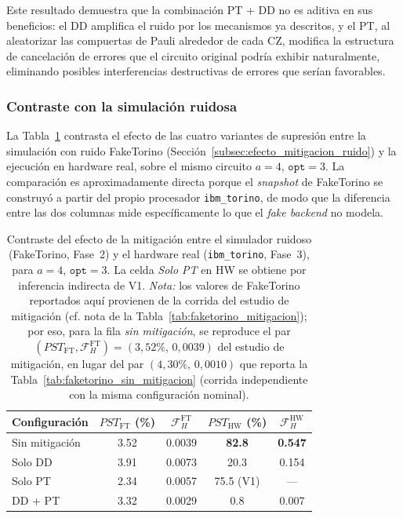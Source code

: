 \documentclass[12pt, spanish]{book}
\begin{document}
Este resultado demuestra que la combinación PT + DD no es aditiva en sus beneficios: el DD amplifica el ruido por los mecanismos ya descritos, y el PT, al aleatorizar las compuertas de Pauli alrededor de cada CZ, modifica la estructura de cancelación de errores que el circuito original podría exhibir naturalmente, eliminando posibles interferencias destructivas de errores que serían favorables.

\subsubsection{Contraste con la simulación ruidosa}

La Tabla~\ref{tab:contraste_mitigacion} contrasta el efecto de las cuatro variantes de supresión entre la simulación con ruido FakeTorino (Sección~\ref{subsec:efecto_mitigacion_ruido}) y la ejecución en hardware real, sobre el mismo circuito $a = 4$, $\texttt{opt}=3$. La comparación es aproximadamente directa porque el \textit{snapshot} de FakeTorino se construyó a partir del propio procesador \texttt{ibm\_torino}, de modo que la diferencia entre las dos columnas mide específicamente lo que el \textit{fake backend} no modela.

\begin{table}[H]
    \centering
    \caption{Contraste del efecto de la mitigación entre el simulador ruidoso (FakeTorino, Fase~2) y el hardware real (\texttt{ibm\_torino}, Fase~3), para $a = 4$, $\texttt{opt}=3$. La celda \emph{Solo PT} en HW se obtiene por inferencia indirecta de V1. \emph{Nota:} los valores de FakeTorino reportados aquí provienen de la corrida del estudio de mitigación (cf. nota de la Tabla~\ref{tab:faketorino_mitigacion}); por eso, para la fila \emph{sin mitigación}, se reproduce el par $(PST_{\text{FT}}, \mathcal{F}_H^{\text{FT}}) = (3{,}52\%,\, 0{,}0039)$ del estudio de mitigación, en lugar del par $(4{,}30\%,\, 0{,}0010)$ que reporta la Tabla~\ref{tab:faketorino_sin_mitigacion} (corrida independiente con la misma configuración nominal).\\}
    \label{tab:contraste_mitigacion}
    \begin{tabular}{lcccc}
        \hline
        Configuración           & $PST_{\text{FT}}$ (\%) & $\mathcal{F}_H^{\text{FT}}$ & $PST_{\text{HW}}$ (\%) & $\mathcal{F}_H^{\text{HW}}$ \\
        \hline
        Sin mitigación          & 3.52                   & 0.0039                      & \textbf{82.8}          & \textbf{0.547}              \\
        Solo DD                 & 3.91                   & 0.0073                      & 20.3                   & 0.154                       \\
        Solo PT                 & 2.34                   & 0.0057                      & 75.5 (V1)              & ---                         \\
        DD + PT                 & 3.32                   & 0.0029                      & 0.8                    & 0.007                       \\
        \hline
    \end{tabular}
\end{table}
\end{document}
